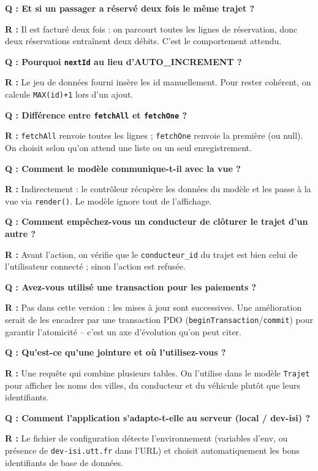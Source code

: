 \documentclass[11pt,a4paper]{article}
\newcommand{\question}[1]{\vspace{0.4em}\noindent\textbf{\color{rouge}Q : #1}\par}
\newcommand{\reponse}[1]{\noindent\textbf{R :} #1\par\vspace{0.4em}}
\begin{document}
\question{Et si un passager a réservé deux fois le même trajet ?}
\reponse{Il est facturé deux fois : on parcourt toutes les lignes de réservation,
donc deux réservations entraînent deux débits. C'est le comportement attendu.}

\question{Pourquoi \texttt{nextId} au lieu d'AUTO\_INCREMENT ?}
\reponse{Le jeu de données fourni insère les id manuellement. Pour rester cohérent,
on calcule \texttt{MAX(id)+1} lors d'un ajout.}

\question{Différence entre \texttt{fetchAll} et \texttt{fetchOne} ?}
\reponse{\texttt{fetchAll} renvoie toutes les lignes ; \texttt{fetchOne} renvoie la
première (ou null). On choisit selon qu'on attend une liste ou un seul enregistrement.}

\question{Comment le modèle communique-t-il avec la vue ?}
\reponse{Indirectement : le contrôleur récupère les données du modèle et les passe à
la vue via \texttt{render()}. Le modèle ignore tout de l'affichage.}

\question{Comment empêchez-vous un conducteur de clôturer le trajet d'un autre ?}
\reponse{Avant l'action, on vérifie que le \texttt{conducteur\_id} du trajet est
bien celui de l'utilisateur connecté ; sinon l'action est refusée.}

\question{Avez-vous utilisé une transaction pour les paiements ?}
\reponse{Pas dans cette version : les mises à jour sont successives. Une amélioration
serait de les encadrer par une transaction PDO (\texttt{beginTransaction}/\texttt{commit})
pour garantir l'atomicité -- c'est un axe d'évolution qu'on peut citer.}

\question{Qu'est-ce qu'une jointure et où l'utilisez-vous ?}
\reponse{Une requête qui combine plusieurs tables. On l'utilise dans le modèle
\texttt{Trajet} pour afficher les noms des villes, du conducteur et du véhicule
plutôt que leurs identifiants.}

\question{Comment l'application s'adapte-t-elle au serveur (local / dev-isi) ?}
\reponse{Le fichier de configuration détecte l'environnement (variables d'env, ou
présence de \texttt{dev-isi.utt.fr} dans l'URL) et choisit automatiquement les bons
identifiants de base de données.}
\end{document}
